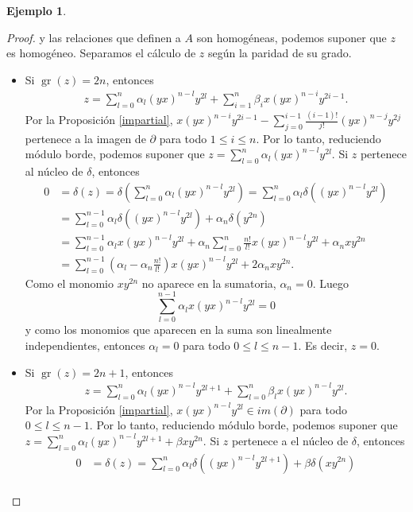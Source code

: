 \documentclass[a4paper,oneside,fleqn,11pt]{report}
\theoremstyle{definition}
\theoremstyle{definition}
\newtheorem{example}{Ejemplo}[section]
\numberwithin{prop}{subsection}
\DeclareMathOperator\gr{gr}
\begin{document}
\begin{example}
\begin{proof}
	y las relaciones que definen a $A$ son homogéneas, podemos suponer que $z$ es homogéneo.
	Separamos el cálculo de $z$ según la paridad de su grado.
	\begin{itemize}
		\item Si $\gr(z) = 2n$, entonces
		\begin{align*}
			z = \sum_{l = 0}^n\alpha_l(yx)^{n - l}y^{2l} + \sum_{i = 1}^n\beta_ix(yx)^{n - i}y^{2i - 1}.
		\end{align*}
		Por la Proposición \ref{impartial}, $x(yx)^{n - i}y^{2i - 1} - \sum_{j = 0}^{i - 1}\frac{(i-1)!}{j!}(yx)^{n - j}y^{2j}$
		pertenece a la imagen de $\partial$ para todo $1 \leq i \leq n$.
		Por lo tanto, reduciendo módulo borde, podemos suponer que $z = \sum_{l = 0}^n\alpha_l(yx)^{n - l}y^{2l}$.
		Si $z$ pertenece al núcleo de $\delta$, entonces
		\begin{align*}
			0 &= \delta(z) = \delta\left(\sum_{l = 0}^n\alpha_l(yx)^{n - l}y^{2l}\right) = \sum_{l = 0}^n\alpha_l\delta((yx)^{n - l}y^{2l}) \\
			&= \sum_{l = 0}^{n - 1}\alpha_l\delta((yx)^{n - l}y^{2l}) + \alpha_n\delta(y^{2n}) \\
				&= \sum_{l = 0}^{n - 1}\alpha_lx(yx)^{n - l}y^{2l} + \alpha_n\sum_{l = 0}^n \frac{n!}{l!}x(yx)^{n - l}y^{2l} + \alpha_nxy^{2n} \\
				&= \sum_{l = 0}^{n - 1}(\alpha_l - \alpha_n\frac{n!}{l!}) x(yx)^{n - l}y^{2l} + 2\alpha_nxy^{2n}.
		\end{align*}	
		Como el monomio $xy^{2n}$ no aparece en la sumatoria, $\alpha_n = 0$.
		Luego
		\[
			\sum_{l = 0}^{n - 1}\alpha_lx(yx)^{n - l}y^{2l} = 0
		\]
		y como los monomios que aparecen en la suma son linealmente independientes, entonces $\alpha_l = 0$ para todo $0 \leq l \leq n -1$.
		Es decir, $z = 0$.
		\item Si $\gr(z) = 2n + 1$, entonces
		\begin{align*}
			z = \sum_{l = 0}^n\alpha_l(yx)^{n - l}y^{2l + 1} + \sum_{l = 0}^n\beta_lx(yx)^{n - l}y^{2l}.
		\end{align*}
		Por la Proposición \ref{impartial}, $x(yx)^{n - l}y^{2l} \in im(\partial)$ para todo $0 \leq l \leq n - 1$.
		Por lo tanto, reduciendo módulo borde, podemos suponer que $z = \sum_{l = 0}^n\alpha_l(yx)^{n - l}y^{2l + 1} + \beta xy^{2n}$.
		Si $z$ pertenece a el núcleo de $\delta$, entonces
		\begin{align*}
			0 &= \delta(z) = \sum_{l = 0}^n\alpha_l\delta((yx)^{n - l}y^{2l + 1}) + \beta \delta(xy^{2n}) \\

\end{align*}
\end{itemize}
\end{proof}
\end{example}
\end{document}
